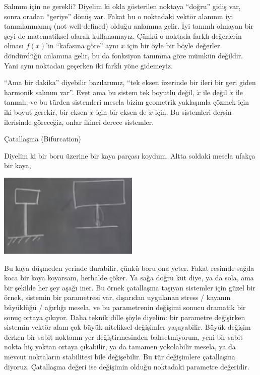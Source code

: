 \documentclass[12pt,fleqn]{article}\usepackage{../../common}
\begin{document}
Salınım için ne gerekli? Diyelim ki okla gösterilen noktaya ``doğru'' gidiş var,
sonra oradan ``geriye'' dönüş var. Fakat bu o noktadaki vektör alanının iyi
tanımlanmamış (not well-defined) olduğu anlamına gelir. İyi tanımlı olmayan bir
şeyi de matematiksel olarak kullanamayız. Çünkü o noktada farklı değerlerin
olması $f(x)$'in ``kafasına göre'' aynı $x$ için bir öyle bir böyle değerler
döndürdüğü anlamına gelir, bu da fonksiyon tanımına göre mümkün değildir. Yani
aynı noktadan geçerken iki farklı yöne gidemeyiz.

``Ama bir dakika'' diyebilir bazılarımız, ``tek eksen üzerinde bir ileri bir
geri giden harmonik salınım var''. Evet ama bu sistem tek boyutlu değil,
$\dot{x}$ ile değil $\ddot{x}$ ile tanımlı, ve bu türden sistemleri mesela bizim
geometrik yaklaşımla çözmek için iki boyut gerekir, bir eksen $\dot{x}$ için bir
eksen de $\ddot{x}$ için. Bu sistemleri dersin ilerisinde göreceğiz, onlar
ikinci derece sistemler.

Çatallaşma (Bifurcation)

Diyelim ki bir boru üzerine bir kaya parçası koydum. Altta soldaki mesela ufakça
bir kaya,

\includegraphics[height=4cm]{02_09.png}

Bu kaya düşmeden yerinde durabilir, çünkü boru ona yeter. Fakat resimde sağda
koca bir koya koyarsam, herhalde çöker. Ya sağa doğru küt diye, ya da sola, ama
bir şekilde her şey aşağı iner. Bu örnek çatallaşma taşıyan sistemler için güzel
bir örnek, sistemin bir parametresi var, dışarıdan uygulanan stress / kayanın
büyüklüğü / ağırlığı mesela, ve bu parametrenin değişimi sonucu dramatik bir
sonuç ortaya çıkıyor.  Daha teknik dille şöyle diyelim: bir parametre değişirken
sistemin vektör alanı çok büyük niteliksel değişimler yaşayabilir. Büyük değişim
derken bir sabit noktanın yer değiştirmesinden bahsetmiyorum, yeni bir sabit
nokta hiç yoktan ortaya çıkabilir, ya da tamamen yokolabilir mesela, ya da
mevcut noktaların stabilitesi bile değişebilir. Bu tür değişimlere çatallaşma
diyoruz.  Çatallaşma değeri ise değişimin olduğu noktadaki parametre değeridir.
\end{document}
